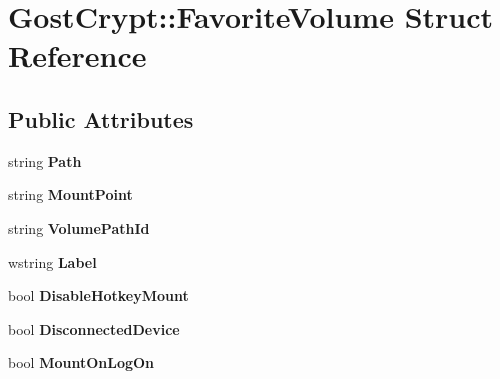 \hypertarget{struct_gost_crypt_1_1_favorite_volume}{}\section{Gost\+Crypt\+:\+:Favorite\+Volume Struct Reference}
\label{struct_gost_crypt_1_1_favorite_volume}
\subsection*{Public Attributes}
\begin{DoxyCompactItemize}
\item 
\mbox{\label{struct_gost_crypt_1_1_favorite_volume_a245a8bb7853427d25be21b7b3fdb98d2}} 
string {\bfseries Path}
\item 
\mbox{\label{struct_gost_crypt_1_1_favorite_volume_ac57cba52c85c47570335169d2aae19b5}} 
string {\bfseries Mount\+Point}
\item 
\mbox{\label{struct_gost_crypt_1_1_favorite_volume_a2702373e60c970281d72abfad49bf92e}} 
string {\bfseries Volume\+Path\+Id}
\item 
\mbox{\label{struct_gost_crypt_1_1_favorite_volume_ab2e56f5e7dfd276510ff5d1ddcd089b1}} 
wstring {\bfseries Label}
\item 
\mbox{\label{struct_gost_crypt_1_1_favorite_volume_ad97f29f392f0f27214bb7e16920311e5}} 
bool {\bfseries Disable\+Hotkey\+Mount}
\item 
\mbox{\label{struct_gost_crypt_1_1_favorite_volume_a5e72d7932c8d0c9184651337a0dc0684}} 
bool {\bfseries Disconnected\+Device}
\item 
\mbox{\label{struct_gost_crypt_1_1_favorite_volume_a0df3e9a42c3e03864fb726de81ef605c}} 
bool {\bfseries Mount\+On\+Log\+On}
\item 
\mbox{\label{struct_gost_crypt_1_1_favorite_volume_ab3f21019a7f13d98b526206aac1d126d}} 

\end{DoxyCompactItemize}
